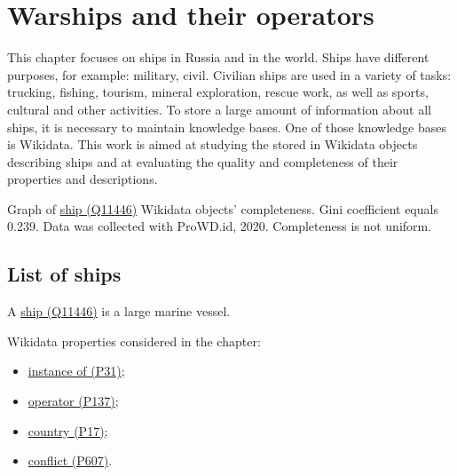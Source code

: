 \setchapterpreamble[u]{\margintoc}
\chapter{Warships and their operators\protect\footnotemark}



This chapter focuses on ships in Russia and in the world. Ships have different purposes, for example: military, civil. Civilian ships are used in a variety of tasks: trucking, fishing, tourism, mineral exploration, rescue work, as well as sports, cultural and other activities. To store a large amount of information about all ships, it is necessary to maintain knowledge bases. One of those knowledge bases is Wikidata. This work is aimed at studying the stored in Wikidata objects describing ships and at evaluating the quality and completeness of their properties and descriptions.


\begin{marginfigure}[0.0cm]
  {
    \setlength{\fboxsep}{0pt}%
    \setlength{\fboxrule}{1pt}%
  }
  \caption[Graph of Wikidata objects' completeness]{Graph of \href{https://www.wikidata.org/wiki/Q11446}{ship (Q11446)} Wikidata objects' completeness. Gini coefficient equals 0.239. Data was collected with ProWD.id, 2020. Completeness is not uniform.}%
  \label{fig:prowd_ships-unbalanced}%
\end{marginfigure}

\section{List of ships}

A \href{https://www.wikidata.org/wiki/Q11446}{ship (Q11446)} is a large marine vessel.



Wikidata properties considered in the chapter: 
\begin{itemize}
  \item \href{https://www.wikidata.org/wiki/Property:P31}{instance of (P31)};
  \item \href{https://www.wikidata.org/wiki/Property:P137}{operator (P137)};
  \item \href{https://www.wikidata.org/wiki/Property:P17}{country (P17)};
  \item \href{https://www.wikidata.org/wiki/Property:P607}{conflict (P607)}.
\end{itemize}

